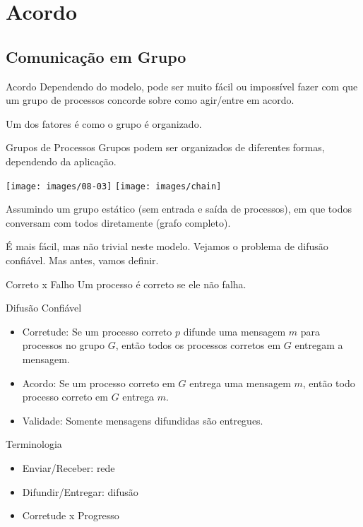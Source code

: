 \section{Acordo}

\subsection{Comunicação em Grupo}
\begin{frame}{Acordo}
Dependendo do modelo, pode ser muito fácil ou impossível fazer com que um grupo de processos concorde sobre como agir/entre em acordo.
\end{frame}

Um dos fatores é como o grupo é organizado.

\begin{frame}{Grupos de Processos}
Grupos podem ser organizados de diferentes formas, dependendo da aplicação.

\texttt{[image: images/08-03]}
\texttt{[image: images/chain]}

Assumindo um grupo estático (sem entrada e saída de processos), em que todos conversam com todos diretamente (grafo completo).
\end{frame}

É mais fácil, mas não trivial neste modelo. Vejamos o problema de difusão confiável. Mas antes, vamos definir.

\begin{frame}{Correto x Falho}
Um processo é correto se ele não falha.
\end{frame}

\begin{frame}{Difusão Confiável}
\begin{itemize}
	\item Corretude: Se um processo \alert{correto} $p$ difunde uma mensagem $m$ para processos no grupo $G$, então todos os processos corretos em $G$ entregam a mensagem.
	
	\item Acordo: Se um processo correto em $G$ entrega uma mensagem $m$, então todo processo correto em $G$ entrega $m$.
	
	\item Validade: Somente mensagens difundidas são entregues.
\end{itemize}
\end{frame}

\begin{frame}{Terminologia}
\begin{itemize}
	\item Enviar/Receber: rede
	\item Difundir/Entregar: difusão
	
	\item Corretude x Progresso
\end{itemize}
\end{frame}




